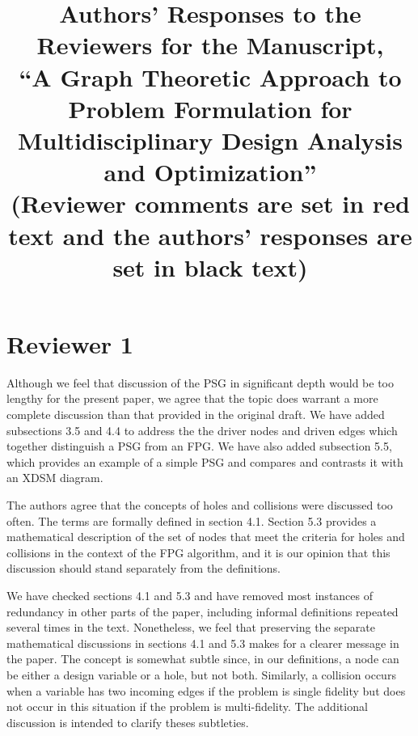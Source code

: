 \documentclass{article} %
\date{}
\title{\large Authors' Responses to the Reviewers for the Manuscript,\\
\large ``A Graph Theoretic Approach to Problem Formulation for
Multidisciplinary Design Analysis and Optimization'' \\  \vspace{0.25in} \normalsize (Reviewer comments are set in red text and the authors' responses are set in black text)}
\begin{document}
\maketitle

\section{Reviewer 1}


Although we feel that discussion of the PSG in significant depth would be too lengthy for the present paper, we agree that the topic does warrant a more complete discussion than that provided in the
original draft.  We have added subsections 3.5 and 4.4 to address the the driver nodes and driven edges which
together distinguish a PSG from an FPG.  We have also added subsection 5.5,
which provides an example of a simple PSG and compares and contrasts it with an XDSM diagram.


The authors agree that the concepts of holes and collisions were discussed too often.  The terms are formally defined in section 4.1. Section 5.3 provides a mathematical description of the set of nodes that meet
the criteria for holes and collisions in the context of the FPG algorithm, and it is our opinion that this discussion should stand separately from the definitions.

We have checked sections 4.1 and 5.3 and have removed most instances of redundancy in other parts of the paper, including informal definitions repeated several times in the text.  Nonetheless, we feel that preserving the separate mathematical discussions in sections 4.1 and 5.3 makes for a clearer message in the paper. The concept is somewhat subtle since, in our definitions, a node can be either a design variable or a hole, but not both. Similarly, a collision occurs when a variable has two incoming edges if the problem is single fidelity but does not occur in this situation if the problem is multi-fidelity. The additional discussion is intended to clarify theses subtleties.
\end{document}
